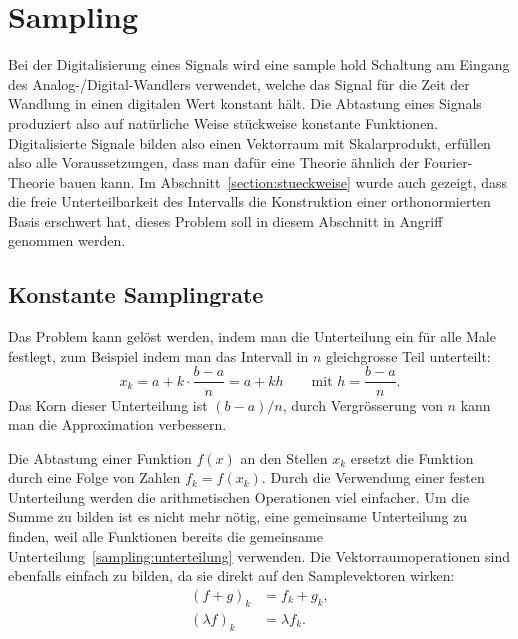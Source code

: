 %
%
%
\section{Sampling%
\label{section:sampling}}
Bei der Digitalisierung eines Signals wird eine sample hold Schaltung am
Eingang des Analog-/Digital-Wandlers verwendet, welche das Signal für die
Zeit der Wandlung in einen digitalen Wert konstant hält.
Die Abtastung eines Signals produziert also auf natürliche Weise
stückweise konstante Funktionen.
Digitalisierte Signale bilden also einen Vektorraum mit Skalarprodukt,
erfüllen also alle Voraussetzungen, dass man dafür eine Theorie ähnlich
der Fourier-Theorie bauen kann.
Im Abschnitt~\ref{section:stueckweise} wurde auch gezeigt, dass die freie
Unterteilbarkeit des Intervalls die Konstruktion einer orthonormierten Basis
erschwert hat, dieses Problem soll in diesem Abschnitt in Angriff genommen
werden.


\subsection{Konstante Samplingrate}
Das Problem kann gelöst werden, indem man die Unterteilung ein für alle
Male festlegt, zum Beispiel indem man das Intervall in $n$ gleichgrosse
Teil unterteilt:
\begin{equation}
x_k = a + k\cdot\frac{b-a}{n} = a + kh
\qquad
\text{mit $\displaystyle h=\frac{b-a}n.$}
\label{sampling:unterteilung}
\end{equation}
Das Korn dieser Unterteilung ist $(b-a)/n$, durch Vergrösserung von $n$
kann man die Approximation verbessern.

Die Abtastung einer Funktion $f(x)$ an den Stellen $x_k$ ersetzt
die Funktion durch eine Folge von Zahlen $f_k = f(x_k)$.
Durch die Verwendung einer festen Unterteilung werden die arithmetischen
Operationen viel einfacher.
Um die Summe zu bilden ist es nicht mehr nötig, eine gemeinsame
Unterteilung zu finden, weil alle Funktionen bereits die gemeinsame
Unterteilung~\eqref{sampling:unterteilung} verwenden.
Die Vektorraumoperationen sind ebenfalls einfach zu bilden,
da sie direkt auf den Samplevektoren wirken:
\begin{align*}
(f+g)_k &= f_k + g_k,\\
(\lambda f)_k &= \lambda f_k.
\end{align*}

